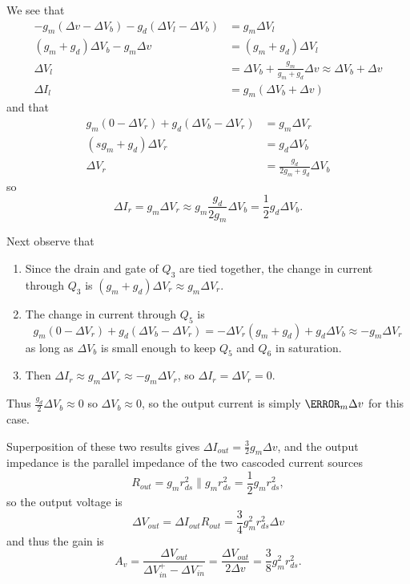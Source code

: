 \documentclass{article}
\begin{document}
We see that
\begin{align*}
  -g_m (\Delta v - \Delta V_b) - g_d (\Delta V_l - \Delta V_b) &= g_m \Delta V_l \\
  (g_m + g_d) \Delta V_b - g_m \Delta v &= (g_m + g_d) \Delta V_l \\
  \Delta V_l &= \Delta V_b + \frac{g_m}{g_m + g_d} \Delta v \approx \Delta V_b + \Delta v \\
  \Delta I_l &= g_m (\Delta V_b + \Delta v)
\end{align*}
and that
\begin{align*}
g_m (0 - \Delta V_r) + g_d (\Delta V_b - \Delta V_r) &= g_m \Delta V_r \\
(s g_m + g_d) \Delta V_r &= g_d \Delta V_b \\
\Delta V_r &= \frac{g_d}{2 g_m + g_d} \Delta V_b
\end{align*}
so
$$
\Delta I_r = g_m \Delta V_r 
           \approx g_m \frac{g_d}{2 g_m} \Delta V_b 
           = \frac{1}{2} g_d \Delta V_b.
$$

Next observe that
\begin{enumerate}
  \item{Since the drain and gate of $Q_3$ are tied together, the change in 
        current through $Q_3$ is 
        $(g_m + g_d) \Delta V_r \approx g_m \Delta V_r$.
       }
  \item{The change in current through $Q_5$ is
        $$
        g_m (0 - \Delta V_r) + g_d (\Delta V_b - \Delta V_r)
      = -\Delta V_r (g_m + g_d) + g_d \Delta V_b \approx -g_m \Delta V_r
        $$
        as long as $\Delta V_b$ is small enough to keep $Q_5$ and $Q_6$ in
        saturation.
       }
   \item{Then $\Delta I_r \approx g_m \Delta V_r \approx -g_m \Delta V_r$, so 
         $\Delta I_r = \Delta V_r = 0$.
        }
\end{enumerate}
Thus $\frac{g_d}{2} \Delta V_b \approx 0$ so $\Delta V_b \approx 0$, so
the output current is simply $\g_m \Delta v$ for this case.

Superposition of these two results gives
$\Delta I_{out} = \frac{3}{2} g_m \Delta v$,
and the output impedance is the parallel impedance of the two cascoded
current sources
$$
R_{out} = g_m r_{ds}^2 \| g_m r_{ds}^2 = \frac{1}{2} g_m r_{ds}^2,
$$
so the output voltage is
$$
\Delta V_{out} = \Delta I_{out} R_{out} = \frac{3}{4} g_m^2 r_{ds}^2 \Delta v
$$
and thus the gain is
$$
A_v = \frac{\Delta V_{out}}{\Delta V_{in}^{+} - \Delta V_{in}^{-}} 
    = \frac{\Delta V_{out}}{2 \Delta v} 
    = \frac{3}{8} g_{m}^2 r_{ds}^2.
$$
\end{document}
